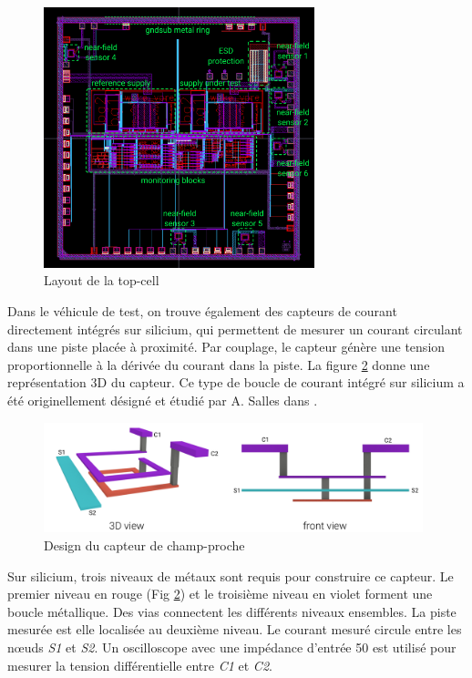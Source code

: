 \begin{figure}[!h]
  \centering
  \includegraphics[width=0.7\textwidth]{src/1/figures/topcell_layout.pdf}
  \caption{Layout de la top-cell}
  \label{fig:top-cell-layout}
\end{figure}

Dans le véhicule de test, on trouve également des capteurs de courant directement intégrés sur silicium, qui permettent de mesurer un courant circulant dans une piste placée à proximité.
Par couplage, le capteur génère une tension proportionnelle à la dérivée du courant dans la piste.
La figure \ref{fig:near-field-current-sensor} donne une représentation 3D du capteur.
Ce type de boucle de courant intégré sur silicium a été originellement désigné et étudié par A. Salles dans \cite{OtherInductors, InductorsLAAS1, InductorsLAAS2, AlainSallesInductors}.

\begin{figure}[!h]
  \centering
  \includegraphics[width=0.98\textwidth]{src/1/figures/near-field-current-sensor.pdf}
  \caption{Design du capteur de champ-proche}
  \label{fig:near-field-current-sensor}
\end{figure}

Sur silicium, trois niveaux de métaux sont requis pour construire ce capteur.
Le premier niveau en rouge (Fig \ref{fig:near-field-current-sensor}) et le troisième niveau en violet forment une boucle métallique.
Des vias connectent les différents niveaux ensembles.
La piste mesurée est elle localisée au deuxième niveau.
Le courant mesuré circule entre les nœuds \textit{S1} et \textit{S2}.
Un oscilloscope avec une impédance d'entrée 50 \textOmega{} est utilisé pour mesurer la tension différentielle entre \textit{C1} et \textit{C2}.

